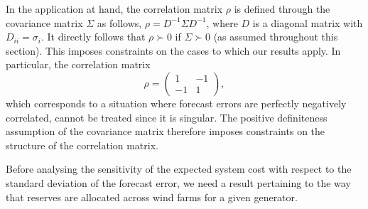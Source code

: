 \documentclass{article}
\begin{document}
In the application at hand, the correlation matrix $\rho$ is defined through the covariance matrix $\Sigma$ as follows, $\rho = D^{-1} \Sigma D^{-1}$, where $D$ is a diagonal matrix with $D_{ii} = \sigma_i$. It directly follows that $\rho \succ 0$ if $\Sigma \succ 0$ (as assumed throughout this section). This imposes constraints on the cases to which our results apply. In particular, the correlation matrix
\begin{equation*}
\rho = \begin{pmatrix} 1 & -1 \\ -1 & 1 \end{pmatrix},
\end{equation*}
which corresponds to a situation where forecast errors are perfectly negatively correlated, cannot be treated since it is singular. The positive definiteness assumption of the covariance matrix therefore imposes constraints on the structure of the correlation matrix.

Before analysing the sensitivity of the expected system cost with respect to the standard deviation of the forecast error, we need a result pertaining to the way that reserves are allocated across wind farms for a given generator.
\end{document}
